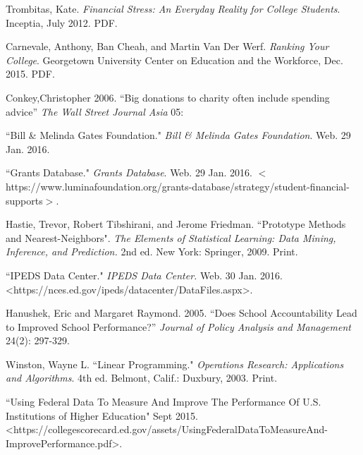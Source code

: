 \documentclass[12pt]{scrartcl}
\begin{document}
\begin{thebibliography}{10}
	 Trombitas, Kate.  \emph{Financial Stress: An Everyday Reality for College Students}. Inceptia, July 2012. PDF. 

	 Carnevale, Anthony, Ban Cheah, and Martin Van Der Werf. \emph{Ranking Your College}. Georgetown University Center on Education and the Workforce, Dec. 2015. PDF.
	
	 Conkey,Christopher 2006. ``Big donations to charity often include spending advice” \emph{The Wall Street Journal Asia} 05:
	
	 ``Bill \& Melinda Gates Foundation." \emph{Bill \& Melinda Gates Foundation}. Web. 29 Jan. 2016. 
	
	 ``Grants Database." \emph{Grants Database}. Web. 29 Jan. 2016. $<$https://www.luminafoundation.org/grants-database/strategy/student-financial-supports$>$. 
	
	 Hastie, Trevor, Robert Tibshirani, and Jerome Friedman. ``Prototype Methods and Nearest-Neighbors". \emph{The Elements of Statistical Learning: Data Mining, Inference, and Prediction.} 2nd ed. New York: Springer, 2009. Print. 

	 ``IPEDS Data Center." \emph{IPEDS Data Center.} Web. 30 Jan. 2016. \textless https://nces.ed.gov/ipeds/datacenter/DataFiles.aspx\textgreater.

	 Hanushek, Eric and Margaret Raymond. 2005. ``Does School Accountability Lead to Improved School Performance?” \emph{Journal of Policy Analysis and Management} 24(2): 297-329.
	
	 Winston, Wayne L. ``Linear Programming."  \emph{Operations Research: Applications and Algorithms}. 4th ed. Belmont, Calif.: Duxbury, 2003. Print.
	
	 ``Using Federal Data To Measure And Improve The Performance Of U.S. Institutions of Higher Education" Sept 2015. \textless https://collegescorecard.ed.gov/assets/UsingFederalDataToMeasureAnd- \\ImprovePerformance.pdf\textgreater.
\end{thebibliography}
\end{document}
